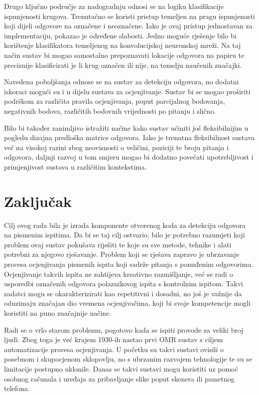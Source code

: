 \documentclass{foi}
\begin{document}
Drugo ključno područje za nadogradnju odnosi se na logiku klasifikacije ispunjenosti krugova. Trenutačno se koristi pristup temeljen na pragu ispunjenosti koji dijeli odgovore na označene i neoznačene. Iako je ovaj pristup jednostavan za implementaciju, pokazao je određene slabosti. Jedno moguće rješenje bilo bi korištenje klasifikatora temeljenog na konvolucijskoj neuronskoj mreži. Na taj način sustav bi mogao samostalno prepoznavati lokacije odgovora na papiru te preciznije klasificirati je li krug označen ili nije, na temelju naučenih značajki.

Navedena poboljšanja odnose se na sustav za detekciju odgovora, no dodatni iskoraci mogući su i u dijelu sustava za ocjenjivanje. Sustav bi se mogao proširiti podrškom za različita pravila ocjenjivanja, poput parcijalnog bodovanja, negativnih bodova, različitih bodovnih vrijednosti po pitanju i slično.

Bilo bi također zanimljivo istražiti načine kako sustav učiniti još fleksibilnijim u pogledu dizajna predloška matrice odgovora. Iako je trenutna fleksibilnost sustava već na visokoj razini zbog neovisnosti o veličini, poziciji te broju pitanja i odgovora, daljnji razvoj u tom smjeru mogao bi dodatno povećati upotrebljivost i primjenjivost sustava u različitim kontekstima.

\chapter{Zaključak}

Cilj ovog rada bila je izrada komponente otvorenog koda za detekciju odgovora na pismenim ispitima. Da bi se taj cilj ostvario, bilo je potrebno razumjeti koji problem ovaj sustav pokušava riješiti te koje su sve metode, tehnike i alati potrebni za njegovo rješavanje. Problem koji se rješava zapravo je ubrzavanje procesa ocjenjivanja pismenih ispita koji sadrže pitanja s ponuđenim odgovorima. Ocjenjivanje takvih ispita ne zahtijeva kreativno razmišljanje, već se radi o usporedbi označenih odgovora polaznikovog ispita s kontrolnim ispitom. Takvi zadatci mogu se okarakterizirati kao repetitivni i dosadni, no još je važnije da oduzimaju značajan dio vremena ocjenjivačima, koji bi svoje kompetencije mogli koristiti na puno značajnije načine.

Radi se o vrlo starom problemu, pogotovo kada se ispiti provode za veliki broj ljudi. Zbog toga je već krajem 1930-ih nastao prvi OMR sustav s ciljem automatizacije procesa ocjenjivanja. U početku su takvi sustavi ovisili o posebnom i skupocjenom sklopovlju, no s ubrzanim razvojem tehnologije te su se limitacije postupno uklonile. Danas se takvi sustavi mogu koristiti uz pomoć osobnog računala i uređaja za pribavljanje slike poput skenera ili pametnog telefona.
\end{document}
